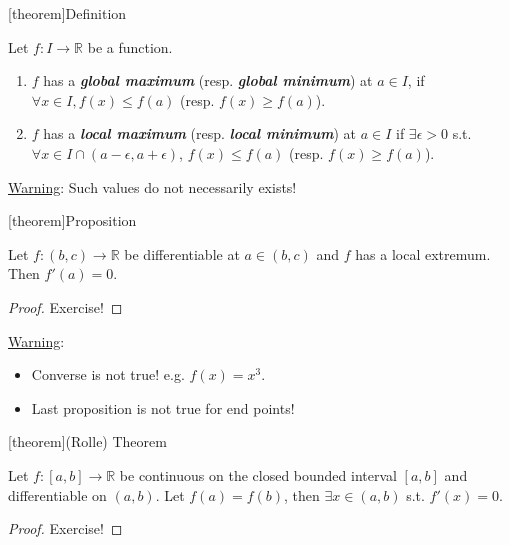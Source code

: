 \documentclass[12pt]{report}
\theoremstyle{definition}
\begin{document}
[theorem]{Definition}
\begin{global/local maximum/minimum}
    Let $f:I\rightarrow{}\mathbb{R}$ be a function.
    \begin{enumerate}[label = (\arabic*)]
        \item $f$ has a \textbf{\emph{global maximum}} (resp. \textbf{\emph{global minimum}})
            at $a\in I$, if $\forall x \in I, f(x) \le f(a)$ (resp. $f(x) \ge f(a)$).
        \item $f$ has a \textbf{\emph{local maximum}} (resp. \textbf{\emph{local minimum}})
            at $a\in I$ if $\exists \epsilon > 0$ s.t. $\forall x \in I \cap (a-\epsilon, a+\epsilon)$,
            $f(x) \le f(a)$ (resp. $f(x) \ge f(a)$).
    \end{enumerate}
\end{global/local maximum/minimum}

\underline{Warning}: Such values do not necessarily exists!

[theorem]{Proposition}
\begin{local extremum differentiated to be 0}
    Let $f:(b,c)\rightarrow{}\mathbb{R}$ be differentiable at $a\in(b,c)$ and 
    $f$ has a local extremum. Then $f'(a) = 0$.
\end{local extremum differentiated to be 0}

\begin{proof}
    Exercise!
\end{proof}

\underline{Warning}:
\begin{itemize}
        \item Converse is not true! e.g. $f(x) = x^{3}$.
        \item Last proposition is not true for end points!
\end{itemize}

[theorem]{(Rolle) Theorem}
\begin{Rolle theorem}
    Let $f:[a,b]\rightarrow{}\mathbb{R}$ be continuous on the closed bounded interval $[a,b]$
    and differentiable on $(a,b)$. Let $f(a) = f(b)$, then $\exists x \in (a,b)$ s.t. $f'(x) = 0$.
\end{Rolle theorem}

\begin{proof}
    Exercise!
\end{proof}
\end{document}
